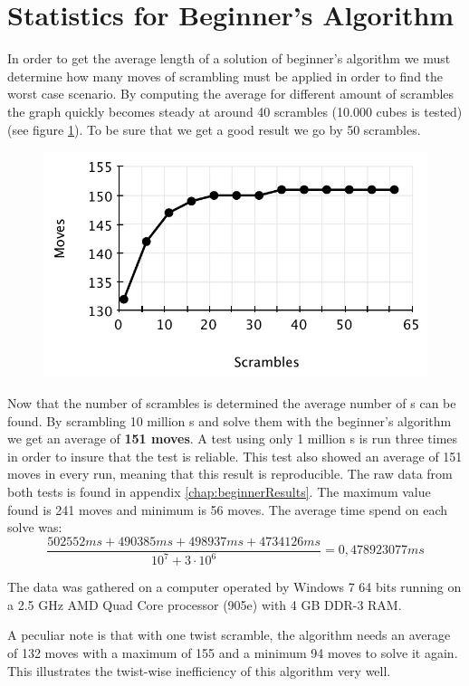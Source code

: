 \section{Statistics for Beginner's Algorithm}
\label{sec:beginnersStat}
In order to get the average length of a solution of beginner's algorithm we must determine how many moves of scrambling must be applied in order to find the worst case scenario. 
By computing the average for different amount of scrambles the graph quickly becomes steady at around 40 scrambles (10.000 cubes is tested) (see figure \ref{fig:beginnersScramble}). To be sure that we get a good result we go by 50 scrambles.
\begin{figure}[htbp]
	\centering
		\includegraphics{input/pics/beginnersScramble.pdf}
	\caption{}
	\label{fig:beginnersScramble}
\end{figure}

Now that the number of scrambles is determined the average number of \twist{}s can be found.
By scrambling 10 million \cube{}s and solve them with the beginner's algorithm we get an average of \textbf{151 moves}.
A test using only 1 million \rubik{}s is run three times in order to insure that the test is reliable.
This test also showed an average of 151 moves in every run, meaning that this result is reproducible.
The raw data from both tests is found in appendix \ref{chap:beginnerResults}.
The maximum value found is 241 moves and minimum is 56 moves.
The average time spend on each solve was:
\[
\frac{502552ms+490385ms+498937ms+4734126ms}{10^{7} + 3 \cdot 10^{6}} = 0,478923077ms
\]

The data was gathered on a computer operated by Windows 7 64 bits running on a 2.5 GHz AMD Quad Core processor (905e) with 4 GB DDR-3 RAM.

A peculiar note is that with one twist scramble, the algorithm needs an average of 132 moves with a maximum of 155 and a minimum 94 moves to solve it again.
This illustrates the twist-wise inefficiency of this algorithm very well.